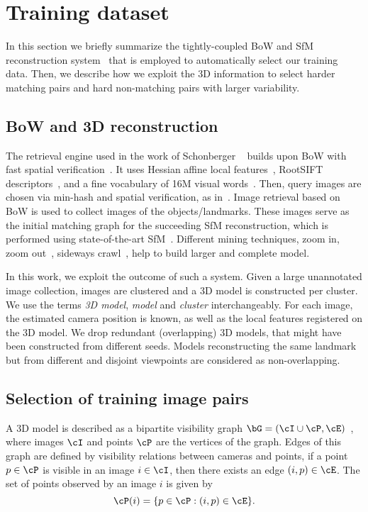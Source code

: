 \section{Training dataset}
\label{sec:dataset}
%
In this section we briefly summarize the tightly-coupled BoW and SfM reconstruction system~\cite{SRCF15,RSJFCM16} that is employed to automatically select our training data. 
Then, we describe how we exploit the 3D information to select harder matching pairs and hard non-matching pairs with larger variability. 

\subsection{BoW and 3D reconstruction}
%
The retrieval engine used in the work of Schonberger \etal~\cite{SRCF15} builds upon BoW with fast spatial verification~\cite{PCISZ07}. 
It uses Hessian affine local features~\cite{MTSZMSKG05}, \mbox{RootSIFT} descriptors~\cite{AZ12}, and a fine vocabulary of 16M visual words~\cite{MPCM13}.
Then, query images are chosen via min-hash and spatial verification, as in~\cite{CM10a}. 
Image retrieval based on BoW is used to collect images of the objects/landmarks.
These images serve as the initial matching graph for the succeeding SfM reconstruction, which is performed using state-of-the-art SfM~\cite{FGGJR10,AFSS+11}. Different mining techniques, \eg zoom in, zoom out~\cite{MCM13,MRCM14}, sideways crawl~\cite{SRCF15}, help to build larger and complete model. 

In this work, we exploit the outcome of such a system. 
Given a large unannotated image collection, images are clustered and a 3D model is constructed per cluster.
We use the terms \emph{3D model}, \emph{model} and \emph{cluster} interchangeably.
For each image, the estimated camera position is known, as well as the local features registered on the 3D model. 
We drop redundant (overlapping) 3D models, that might have been constructed from different seeds.
Models reconstructing the same landmark but from different and disjoint viewpoints are considered as non-overlapping.

\subsection{Selection of training image pairs}

A 3D model is described as a bipartite visibility graph $\bG = (\cI \cup \cP,\cE)$~\cite{LSH10}, where images $\cI$ and points $\cP$ are the vertices of the graph. 
Edges of this graph are defined by visibility relations between cameras and points, \ie if a point $p\in \cP$ is visible in an image $i\in \cI$, then there exists an edge $(i,p) \in \cE$. 
The set of points observed by an image $i$ is given by
%
\begin{equation}
\label{equ:observed_points}
\cP(i) = \{ p \in \cP: (i,p) \in \cE \}.
\end{equation} 
%

